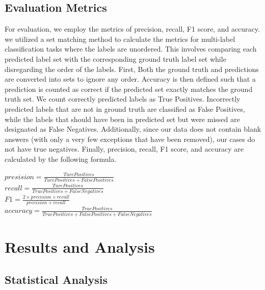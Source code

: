 \documentclass[a4paper]{article}
\begin{document}
\subsection{Evaluation Metrics}
For evaluation, we employ the metrics of precision, recall, F1 score, and accuracy. we utilized a set matching method to calculate the metrics 
for multi-label classification tasks where the labels are unordered. 
This involves comparing each predicted label set with the corresponding ground truth label set while disregarding the order of the labels. 
First, Both the ground truth and predictions are converted into sets to ignore any order. Accuracy is then defined such that a prediction is 
counted as correct if the predicted set exactly matches the ground truth set. We count correctly predicted labels as True Positives. 
Incorrectly predicted labels that are not in ground truth are classified as False Positives, while the labels that should have been in predicted set 
but were missed are designated as False Negatives. Additionally, since our data does not contain blank answers (with only a very few exceptions that have been removed), 
our cases do not have true negatives. Finally, precision, recall, F1 score, and accuracy are calculated by the following formula.
\begin{center}
$presision=\frac{Ture Positives}{Ture Positives + False Positives}$\\ [0.3 cm]
$recall=\frac{Ture Positives}{True Positives + False Negatives}$\\ [0.3 cm]
$F1=\frac{2 \times precision \times recall}{precision + recall}$\\ [0.3 cm]
$accuracy=\frac{True Positives}{True Positives + False Positives + False Negatives}$
\end{center}

\section{Results and Analysis}
\subsection{Statistical Analysis}
\end{document}
